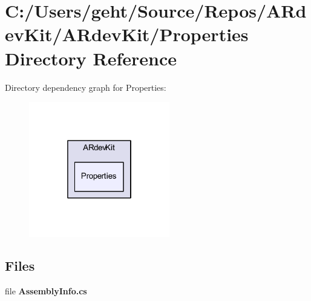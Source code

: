 \section{C\-:/\-Users/geht/\-Source/\-Repos/\-A\-Rdev\-Kit/\-A\-Rdev\-Kit/\-Properties Directory Reference}
\label{dir_3d2a927618998007640a865edbbedffe}
Directory dependency graph for Properties\-:
\nopagebreak
\begin{figure}[H]
\begin{center}
\leavevmode
\includegraphics[width=174pt]{dir_3d2a927618998007640a865edbbedffe_dep}
\end{center}
\end{figure}
\subsection*{Files}
\begin{DoxyCompactItemize}
\item 
file {\bfseries Assembly\-Info.\-cs}
\end{DoxyCompactItemize}
